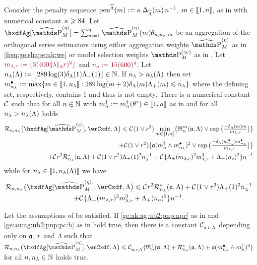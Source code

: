 \begin{thm}
  Consider the   penalty sequence $\peneSv:=\peneD$,
  $\Di\in\nset{1,\ssY}$, as in  with numerical
  constant $\cpen\geq84$. Let
  $\hxdfAg[{\erWe[]}]=\sum_{\Di=1}^{\ssY} \erWe\hxdfPr$ be an
  aggregation of the orthogonal series estimators using either
  aggregation weights $\erWe[]$ as in \eqref{freq:ge:shape:uk:we} or model
  selection weights $\msWe[]$ as in . Let
  $\dr\Di_{\edf,\xdfCr}:=\floor{3(400\Vnorm[{\xdfCw[]}]{\edf}\xdfCr)^2}$
  and $\dr \ssY_{o}:=15({600})^4$. Let
  $\ssE(\Lambda):=\floor{289\log(3)\cmiSv[1]\miSv[1]}\in\Nz$. If
  $\ssE>\ssE(\Lambda)$ then set
  $\sDi{\ssE}:=\max\{\Di\in\nset{1,\ssE}:289\log(\Di+2)\cmiSv[\Di]\miSv[\Di]\leq\ssE\}$
  where the defining set, respectively, contains $1$ and thus is not
  empty.  There is a numerical constant $\cst{}$ such that for all
  $\ssY\in\Nz$ with $\aDi{\ssY}:=\aDi{\ssY}(\xdf)\in\nset{1,n}$ as in
   and for all $\ssE>\ssE(\Lambda)$ holds
  \begin{multline}
    \nmRi{\hxdfAg[{\erWe[]}]}{\rwCxdf,\Lambda}  
    \leq\cst{}(1\vee\xdfCr^2)\min_{\Di\in\nset{1,\ssY}}
    \{\daRa{\Di}{(\xdfCw[],\Lambda)}\vee
    \exp\big(\tfrac{-\cmiSv[\Di]\Di}{\Di_{\edf,\xdfCr}}\big)\} \\\hfill
    +\cst{}(1\vee\xdfCr^2)\{\xdfCw[(\aDi{\ssY}\wedge\sDi{\ssE})]^2\vee
    \exp\big(\tfrac{-\cmiSv[\sDi{\ssE}]\sDi{\ssE}}{\Di_{\edf,\xdfCr}}\big)\}\\\hfill
    +\cst{}\xdfCr^2\mmRa{\xdfCw[],\Lambda}   + \cst{}(1\vee\xdfCr^2)\miSv[1]^2\ssE^{-1}  
    +\cst{}\{\miSv[\Di_{\edf,\xdfCr}]^2\Di_{\edf,\xdfCr}^3+\miSv[\ssY_{o}]^2\}\ssY^{-1}
  \end{multline}
  while for $\ssE\in\nset{1,\ssE(\Lambda)}$ we have
  \begin{multline}
    \nmRi{\hxdfAg[{\erWe[]}]}{\rwCxdf,\Lambda}  
    \leq \cst{}\xdfCr^2\mmRa{\xdfCw[],\Lambda}
    + \cst{}(1\vee\xdfCr^2)\miSv[1]^2\ssE^{-1}\\
    +\cst{}\{\miSv[\Di_{\edf,\xdfCr}]^2\Di_{\edf,\xdfCr}^3+\miSv[\ssY_{o}]^2\}\ssY^{-1}.
  \end{multline}
\end{thm}


\begin{cor}
  Let the assumptions of  be satisfied.
    If  \ref{ge:ak:ag:ub2:pnp:npc} as in  and \ref{ge:au:ag:ub2:pnp:pc:b}
    as in  hold true, then there is a constant $\cst{\xdfCw[],\xdfCr,\Lambda}$ depending
    only on $\xdfCw[]$, $\xdfCr$ and $\Lambda$ such that $\nmRi{\hxdfAg[{\erWe[]}]}{\rwCxdf,\Lambda}
    \leq \cst{\xdfCw[],\xdfCr,\Lambda}\{\naRa{(\xdfCw[],\Lambda)}+\mmRa{\xdfCw[],\Lambda}+\xdfCw[(\sDi{\ssE}\wedge\aDi{\ssY})]^2\}$ for all $\ssY,\ssE\in\Nz$ holds true.
\end{cor}